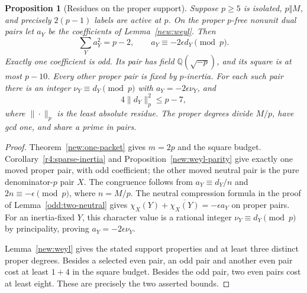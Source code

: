 \documentclass[11pt]{amsart}
\numberwithin{equation}{section}
\newtheorem{proposition}[theorem]{Proposition}
\theoremstyle{definition}
\theoremstyle{plain}
\begin{document}
\begin{proposition}[Residues on the proper support]
\label{new:minimal-proper-residue}
Suppose $p\ge5$ is isolated, $p\Vert M$, and precisely $2(p-1)$
labels are active at $p$.  On the proper $p$-free nonunit dual pairs
let $a_Y$ be the coefficients of Lemma~\ref{new:weyl}.  Then
\[
 \sum_Ya_Y^2=p-2,\qquad
 a_Y\equiv-2\epsilon d_Y\pmod p.
\]
Exactly one coefficient is odd.  Its pair has field
$\mathbb Q(\sqrt{-p})$, and its square is at most $p-10$.
Every other proper pair is fixed by $p$-inertia.  For each such pair
there is an integer $\nu_Y\equiv d_Y\pmod p$ with
$a_Y=-2\epsilon\nu_Y$, and
\[
                   4\|d_Y\|_p^2\le p-7,
\]
where $\|\cdot\|_p$ is the least absolute residue.
The proper degrees divide $M/p$, have gcd one, and share a prime
in pairs.
\end{proposition}
\begin{proof}
Theorem~\ref{new:one-packet} gives $m=2p$ and the square budget.
Corollary~\ref{r4:sparse-inertia} and Proposition~\ref{new:weyl-parity}
give exactly one moved proper pair, with odd coefficient; the
other moved neutral pair is the pure denominator-$p$ pair $X$.
The congruence follows from $a_Y\equiv d_Y/n$ and
$2n\equiv-\epsilon\pmod p$, where $n=M/p$.
The neutral compression formula in the proof of
Lemma~\ref{odd:two-neutral} gives
$\chi_X(Y)+\overline{\chi_X(Y)}=-\epsilon a_Y$ on proper pairs.
For an inertia-fixed $Y$, this character value is a rational
integer $\nu_Y\equiv d_Y\pmod p$ by principality, proving
$a_Y=-2\epsilon\nu_Y$.

Lemma~\ref{new:weyl} gives the stated support properties and at
least three distinct proper degrees. Besides a selected even pair,
an odd pair and another even pair cost at least $1+4$ in the
square budget. Besides the odd pair, two even pairs cost at least
eight. These are precisely the two asserted bounds.
\end{proof}
\end{document}
